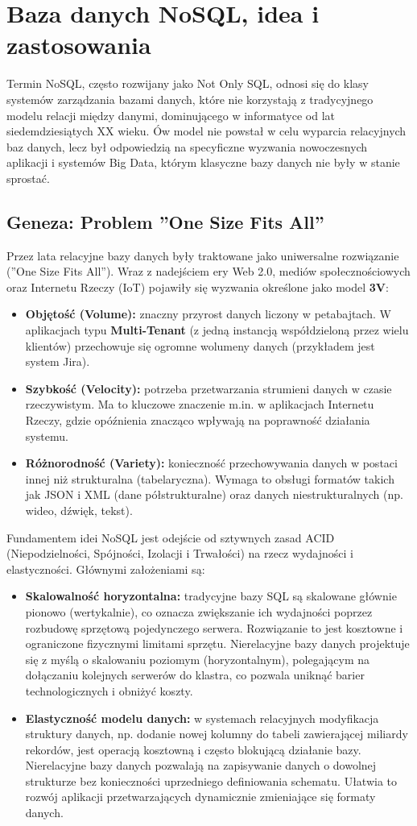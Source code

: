 \section{Baza danych NoSQL, idea i zastosowania}
Termin NoSQL, często rozwijany jako Not Only SQL, odnosi się do klasy systemów zarządzania bazami danych, które nie korzystają z tradycyjnego modelu relacji między danymi, dominującego w informatyce od lat siedemdziesiątych XX wieku. Ów model nie powstał w celu wyparcia relacyjnych baz danych, lecz był odpowiedzią na specyficzne wyzwania nowoczesnych aplikacji i systemów Big Data, którym klasyczne bazy danych nie były w stanie sprostać.
\subsection{Geneza: Problem ''One Size Fits All''}
Przez lata relacyjne bazy danych były traktowane jako uniwersalne rozwiązanie (''One Size Fits All''). Wraz z nadejściem ery Web 2.0, mediów społecznościowych oraz Internetu Rzeczy (IoT) pojawiły się wyzwania określone jako model \textbf{3V}:
\begin{itemize}
    \item \textbf{Objętość (Volume):} znaczny przyrost danych liczony w petabajtach. W aplikacjach typu \textbf{Multi-Tenant} (z jedną instancją współdzieloną przez wielu klientów) przechowuje się ogromne wolumeny danych (przykładem jest system Jira).
    \item \textbf{Szybkość (Velocity):} potrzeba przetwarzania strumieni danych w czasie rzeczywistym. Ma to kluczowe znaczenie m.in. w aplikacjach Internetu Rzeczy, gdzie opóźnienia znacząco wpływają na poprawność działania systemu.
    \item \textbf{Różnorodność (Variety):} konieczność przechowywania danych w postaci innej niż strukturalna (tabelaryczna). Wymaga to obsługi formatów takich jak JSON i XML (dane półstrukturalne) oraz danych niestrukturalnych (np. wideo, dźwięk, tekst).
\end{itemize}
Fundamentem idei NoSQL jest odejście od sztywnych zasad ACID (Niepodzielności, Spójności, Izolacji i Trwałości) na rzecz wydajności i elastyczności. Głównymi założeniami są:
\begin{itemize}
    \item \textbf{Skalowalność horyzontalna:} tradycyjne bazy SQL są skalowane głównie pionowo (wertykalnie), co oznacza zwiększanie ich wydajności poprzez rozbudowę sprzętową pojedynczego serwera. Rozwiązanie to jest kosztowne i ograniczone fizycznymi limitami sprzętu. Nierelacyjne bazy danych projektuje się z myślą o skalowaniu poziomym (horyzontalnym), polegającym na dołączaniu kolejnych serwerów do klastra, co pozwala uniknąć barier technologicznych i obniżyć koszty.
    \item \textbf{Elastyczność modelu danych:} w systemach relacyjnych modyfikacja struktury danych, np. dodanie nowej kolumny do tabeli zawierającej miliardy rekordów, jest operacją kosztowną i często blokującą działanie bazy. Nierelacyjne bazy danych pozwalają na zapisywanie danych o dowolnej strukturze bez konieczności uprzedniego definiowania schematu. Ułatwia to rozwój aplikacji przetwarzających dynamicznie zmieniające się formaty danych.
\end{itemize}
